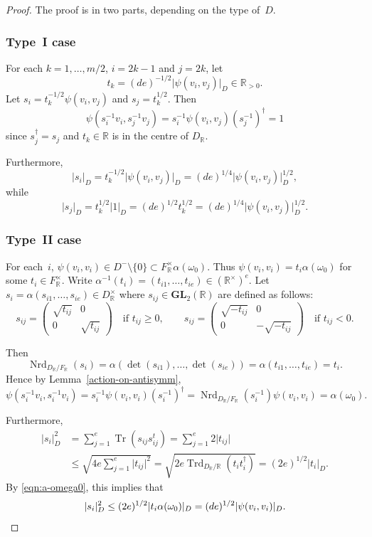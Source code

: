 \documentclass[11pt]{article}
\numberwithin{equation}{section}
\newcommand{\bR}{\mathbb{R}}
\newcommand{\gGL}{\mathbf{GL}}
\DeclareMathOperator{\Nrd}{Nrd}
\DeclareMathOperator{\Tr}{Tr}
\DeclareMathOperator{\Trd}{Trd}
\newcommand{\abs}[1]{\lvert #1 \rvert}
\newcommand{\fullmatrix}[4]{\left( \begin{matrix} #1 & #2 \\ #3 & #4 \end{matrix} \right)}
\begin{document}
\begin{proof}
The proof is in two parts, depending on the type of~$D$.

\subsubsection*{Type~I case}
For each $k = 1, \dotsc, m/2$, $i=2k-1$ and $j=2k$, let
\[
t_k = (de)^{-1/2} \abs{\psi(v_i, v_j)}_D \in \bR_{>0}.
\]
Let $s_i = t_k^{-1/2} \psi(v_i, v_j)$ and $s_j = t_k^{1/2}$.
Then
\[
\psi(s_i^{-1} v_i, s_j^{-1} v_j) = s_i^{-1} \psi(v_i, v_j) (s_j^{-1})^\dag = 1
\]
since $s_j^\dag = s_j$ and $t_k \in \bR$ is in the centre of $D_\bR$.

Furthermore,
\[
\abs{s_i}_D = t_k^{-1/2} \abs{\psi(v_i, v_j)}_D = (de)^{1/4} \abs{\psi(v_i, v_j)}_D^{1/2},
\]
while
\[
\abs{s_j}_D = t_k^{1/2} \abs{1}_D = (de)^{1/2} t_k^{1/2} = (de)^{1/4} \abs{\psi(v_i, v_j)}_D^{1/2}.
\]

\subsubsection*{Type~II case}
For each~$i$, $\psi(v_i, v_i) \in D^- \setminus\{0\} \subset F_\bR^\times \alpha(\omega_0)$.
Thus $\psi(v_i, v_i) = t_i\alpha(\omega_0)$ for some $t_i \in F_\bR^\times$.
Write $\alpha^{-1}(t_i) = (t_{i1}, \dotsc, t_{ie}) \in (\bR^\times)^e$.
Let $s_i = \alpha(s_{i1}, \dotsc, s_{ie}) \in D_\bR^\times$ where $s_{ij} \in \gGL_2(\bR)$ are defined as follows:
\[
s_{ij} = \fullmatrix{\sqrt{t_{ij}}}{0}{0}{\sqrt{t_{ij}}} \quad\text{if } t_{ij} \geq 0,\qquad
s_{ij} = \fullmatrix{\sqrt{-t_{ij}}}{0}{0}{-\sqrt{-t_{ij}}} \quad\text{if } t_{ij} < 0.
\]

Then
\[
\Nrd_{D_\bR/F_\bR}(s_i) = \alpha(\det(s_{i1}), \dotsc, \det(s_{ie})) = \alpha(t_{i1}, \dotsc, t_{ie}) = t_i.
\]
Hence by Lemma~\ref{action-on-antisymm},
\[
\psi(s_i^{-1} v_i, s_i^{-1} v_i) = s_i^{-1} \psi(v_i, v_i) (s_i^{-1})^\dag = \Nrd_{D_\bR/F_\bR}(s_i^{-1}) \psi(v_i, v_i) = \alpha(\omega_0).
\]

Furthermore,
\begin{align*}
\abs{s_i}_D^2
& = \sum_{j=1}^e \Tr(s_{ij} s_{ij}^t)
= \sum_{j=1}^e 2\abs{t_{ij}}
\\& \leq \sqrt{4e \textstyle\sum_{j=1}^e \abs{t_{ij}}^2}
= \sqrt{2e \Trd_{D_\bR/\bR}(t_i t_i^\dag)}
= (2e)^{1/2} \abs{t_i}_D.
\end{align*}
By \eqref{eqn:a-omega0}, this implies that
\[
\abs{s_i}_D^2 \leq (2e)^{1/2} \abs{t_i\alpha(\omega_0)}_D = (de)^{1/2} \abs{\psi(v_i, v_i)}_D.
\qedhere
\]
\end{proof}
\end{document}

